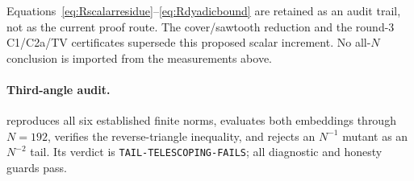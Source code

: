 \begin{remark}
Equations~\eqref{eq:Rscalarresidue}--\eqref{eq:Rdyadicbound} are retained as
an audit trail, not as the current proof route.  The cover/sawtooth reduction
and the round-3 C1/C2a/TV certificates supersede this proposed scalar
increment.  No all-$N$ conclusion is imported from the measurements above.
\end{remark}

\paragraph{Third-angle audit.}
 reproduces all
six established finite norms, evaluates both embeddings through
$N=192$, verifies the reverse-triangle inequality, and rejects an
$N^{-1}$ mutant as an $N^{-2}$ tail.  Its verdict is
\texttt{TAIL-TELESCOPING-FAILS}; all diagnostic and honesty guards pass.

